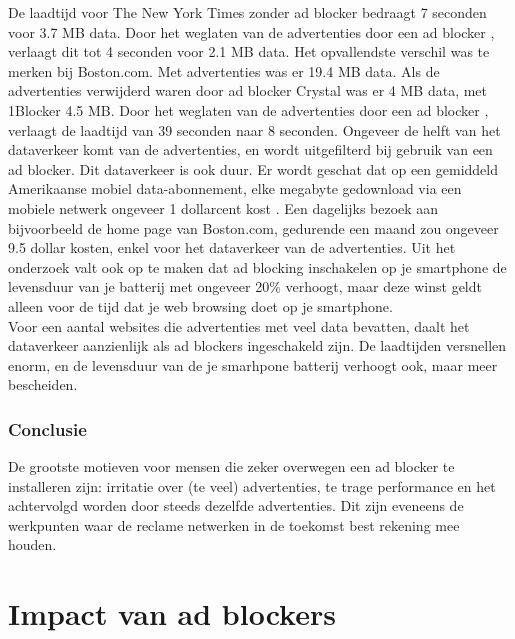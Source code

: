 \documentclass[pdftex,a4paper,12pt,twoside]{report}
\begin{document}
De laadtijd voor The New York Times zonder ad blocker bedraagt 7 seconden voor 3.7 MB data. Door het weglaten van de advertenties door een ad blocker , verlaagt dit tot 4 seconden voor 2.1 MB data. Het opvallendste verschil was te merken bij Boston.com. Met advertenties was er 19.4 MB data. Als de advertenties verwijderd waren door ad blocker Crystal was er 4 MB data, met 1Blocker 4.5 MB. Door het weglaten van de advertenties door een ad blocker , verlaagt de laadtijd van 39 seconden naar 8 seconden.
Ongeveer de helft van het dataverkeer komt van de advertenties, en wordt uitgefilterd bij gebruik van een ad blocker. Dit dataverkeer is ook duur. Er wordt geschat dat op een gemiddeld Amerikaanse mobiel data-abonnement, elke megabyte gedownload via een mobiele netwerk ongeveer 1 dollarcent kost . Een dagelijks bezoek aan bijvoorbeeld de home page van Boston.com, gedurende een maand zou ongeveer 9.5 dollar kosten, enkel voor het dataverkeer van de advertenties. 
Uit het onderzoek valt ook op te maken dat ad blocking inschakelen op je smartphone de levensduur van je batterij met ongeveer 20\% verhoogt, maar deze winst geldt alleen voor de tijd dat je web browsing doet op je smartphone.
\\
Voor een aantal websites die advertenties met veel data bevatten, daalt het dataverkeer aanzienlijk als ad blockers ingeschakeld zijn. De laadtijden versnellen enorm, en de levensduur van de je smarhpone batterij verhoogt ook, maar meer bescheiden.

\subsection{Conclusie}
\label{sec Conclusie}
De grootste motieven voor mensen die zeker overwegen een ad blocker te installeren zijn: irritatie over (te veel) advertenties, te trage performance en het achtervolgd worden door steeds dezelfde advertenties. Dit zijn eveneens de werkpunten waar de reclame netwerken in de toekomst best rekening mee houden. 

\chapter{Impact van ad blockers}
\label{ch: Impact van ad blockers}
\end{document}
